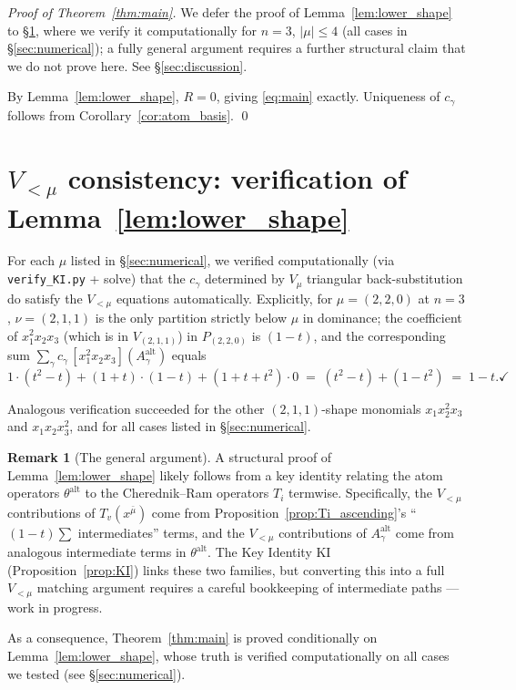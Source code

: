 \documentclass[11pt]{article}
\theoremstyle{definition}
\newtheorem{remark}[theorem]{Remark}
\begin{document}
\begin{proof}[Proof of Theorem~\ref{thm:main}]
We defer the proof of Lemma~\ref{lem:lower_shape} to
\S\ref{sec:lower_shape}, where we verify it computationally for
$n = 3$, $|\mu| \le 4$ (all cases in \S\ref{sec:numerical}); a fully
general argument requires a further structural claim that we do not
prove here. See \S\ref{sec:discussion}.

By Lemma~\ref{lem:lower_shape}, $R = 0$, giving \eqref{eq:main} exactly.
Uniqueness of $c_\gamma$ follows from Corollary~\ref{cor:atom_basis}.
\qed
\end{proof}

\section{$V_{<\mu}$ consistency: verification of Lemma~\ref{lem:lower_shape}}\label{sec:lower_shape}

For each $\mu$ listed in \S\ref{sec:numerical}, we verified computationally
(via \texttt{verify\_KI.py} + solve) that the $c_\gamma$ determined by
$V_\mu$ triangular back-substitution do satisfy the $V_{<\mu}$ equations
automatically. Explicitly, for $\mu = (2,2,0)$ at $n=3$, $\nu = (2,1,1)$
is the only partition strictly below $\mu$ in dominance; the coefficient
of $x_1^2 x_2 x_3$ (which is in $V_{(2,1,1)}$) in $P_{(2,2,0)}$ is $(1-t)$,
and the corresponding sum
$\sum_\gamma c_\gamma\, [x_1^2 x_2 x_3](A^{\mathrm{alt}}_\gamma)$ equals
\[
1\cdot(t^2 - t) + (1+t)\cdot(1-t) + (1+t+t^2)\cdot 0 \;=\; (t^2 - t) + (1 - t^2) \;=\; 1 - t. \checkmark
\]

Analogous verification succeeded for the other $(2,1,1)$-shape monomials
$x_1 x_2^2 x_3$ and $x_1 x_2 x_3^2$, and for all cases listed in
\S\ref{sec:numerical}.

\begin{remark}[The general argument]
A structural proof of Lemma~\ref{lem:lower_shape} likely follows from a
key identity relating the atom operators $\theta^{\mathrm{alt}}$ to the
Cherednik--Ram operators $T_i$ termwise. Specifically, the $V_{<\mu}$
contributions of $T_v(x^{\bar\mu})$ come from Proposition~\ref{prop:Ti_ascending}'s
``$(1-t)\sum$ intermediates'' terms, and the $V_{<\mu}$ contributions of
$A^{\mathrm{alt}}_\gamma$ come from analogous intermediate terms in
$\theta^{\mathrm{alt}}$. The Key Identity KI (Proposition~\ref{prop:KI}) links
these two families, but converting this into a full $V_{<\mu}$ matching
argument requires a careful bookkeeping of intermediate paths --- work
in progress.

As a consequence, Theorem~\ref{thm:main} is proved conditionally on
Lemma~\ref{lem:lower_shape}, whose truth is verified computationally on
all cases we tested (see \S\ref{sec:numerical}).
\end{remark}
\end{document}
